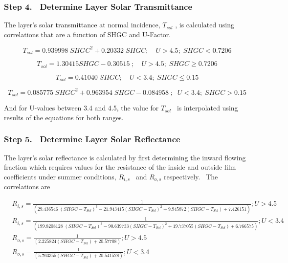 \subsubsection{Step 4.~ Determine Layer Solar Transmittance}\label{step-4.-determine-layer-solar-transmittance}

The layer's solar transmittance at normal incidence, \({T_{sol}}\) , is calculated using correlations that are a function of SHGC and U-Factor.

\begin{equation}
{T_{sol}} = 0.939998\;SHG{C^2} + 0.20332\;SHGC;\quad U > 4.5;\;SHGC < 0.7206
\end{equation}

\begin{equation}
{T_{sol}} = 1.30415SHGC - 0.30515\;;\quad U > 4.5;\;SHGC \ge 0.7206
\end{equation}

\begin{equation}
{T_{sol}} = 0.41040\;SHGC;\quad U < 3.4;\;SHGC \le 0.15
\end{equation}

\begin{equation}
{T_{sol}} = 0.085775\;SHG{C^2} + 0.963954\;SHGC - 0.084958\;;\;\;U < 3.4;\;SHGC > 0.15
\end{equation}

And for U-values between 3.4 and 4.5, the value for \({T_{sol}}\) ~is interpolated using results of the equations for both ranges.

\subsubsection{Step 5.~ Determine Layer Solar Reflectance}\label{step-5.-determine-layer-solar-reflectance}

The layer's solar reflectance is calculated by first determining the inward flowing fraction which requires values for the resistance of the inside and outside film coefficients under summer conditions, \({R_{i,s}}\) ~and \({R_{o,s}}\) respectively.~ The correlations are

{\scriptsize
\begin{equation}
\begin{split}
&{R_{i,s}} = \frac{1}{{\left( {29.436546\;{{\left( {SHGC - {T_{Sol}}} \right)}^3} - 21.943415{{\left( {SHGC - {T_{Sol}}} \right)}^2} + 9.945872\left( {SHGC - {T_{Sol}}} \right) + 7.426151} \right)}}; U > 4.5 \\
&{R_{i,s}} = \frac{1}{{\left( {199.8208128\;{{\left( {SHGC - {T_{Sol}}} \right)}^3} - 90.639733{{\left( {SHGC - {T_{Sol}}} \right)}^2} + 19.737055\left( {SHGC - {T_{Sol}}} \right) + 6.766575} \right)}}; U < 3.4 \\
&{R_{o,s}} = \frac{1}{{\left( {2.225824(SHGC - {T_{Sol}}) + 20.57708} \right)}}; U > 4.5 \\
&{R_{o,s}} = \frac{1}{{\left( {5.763355(SHGC - {T_{Sol}}) + 20.541528} \right)}}; U < 3.4
\end{split}
\end{equation}}

